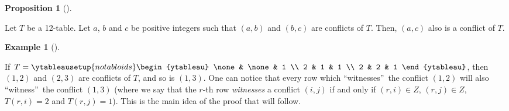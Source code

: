 \documentclass[numbers=enddot,12pt,final,onecolumn,notitlepage]{scrartcl}%
\theoremstyle{definition}
\newtheorem{prop}[theo]{Proposition}
\newenvironment{proposition}[1][]
{\begin{prop}[#1]\begin{leftbar}}
{\end{leftbar}\end{prop}}
\newtheorem{exmp}[theo]{Example}
\newenvironment{example}[1][]
{\begin{exmp}[#1]\begin{leftbar}}
{\end{leftbar}\end{exmp}}
\begin{document}
\begin{proposition}
\label{prop.conflict.transitive}Let $T$ be a 12-table. Let $a$, $b$ and $c$ be
positive integers such that $\left(  a,b\right)  $ and $\left(  b,c\right)  $
are conflicts of $T$. Then, $\left(  a,c\right)  $ also is a conflict of $T$.
\end{proposition}

\begin{example}
If $T=%
\ytableausetup{notabloids}
\begin{ytableau}
\none& \none& 1 \\
2 & 1 & 1 \\
2 & 2 & 1
\end{ytableau}%
$, then $\left(  1,2\right)  $ and $\left(  2,3\right)  $ are conflicts of
$T$, and so is $\left(  1,3\right)  $. One can notice that every row which
\textquotedblleft witnesses\textquotedblright\ the conflict $\left(
1,2\right)  $ will also \textquotedblleft witness\textquotedblright\ the
conflict $\left(  1,3\right)  $ (where we say that the $r$-th row
\textit{witnesses} a conflict $\left(  i,j\right)  $ if and only if $\left(
r,i\right)  \in Z$, $\left(  r,j\right)  \in Z$, $T\left(  r,i\right)  =2$ and
$T\left(  r,j\right)  =1$). This is the main idea of the proof that will follow.
\end{example}
\end{document}
